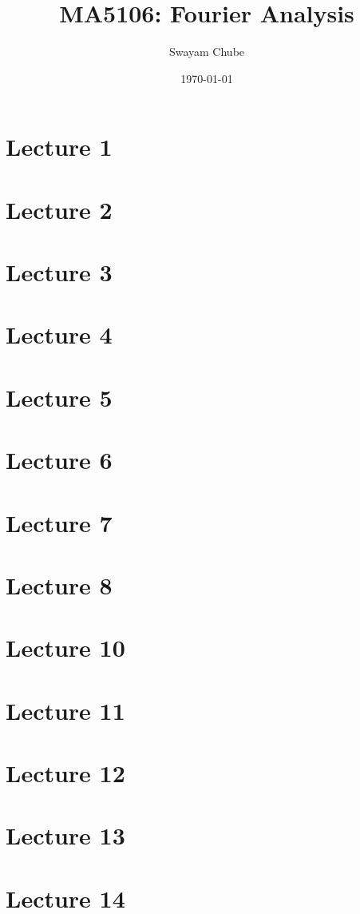 \documentclass{report}
\title{MA5106: Fourier Analysis}
\author{Swayam Chube}
\date{\today}
\begin{document}
\maketitle

\tableofcontents

\chapter{Lecture 1}


\chapter{Lecture 2}


\chapter{Lecture 3}


\chapter{Lecture 4}


\chapter{Lecture 5}


\chapter{Lecture 6}


\chapter{Lecture 7}


\chapter{Lecture 8}


\chapter{Lecture 10}


\chapter{Lecture 11}


\chapter{Lecture 12}


\chapter{Lecture 13}


\chapter{Lecture 14}

\end{document}
